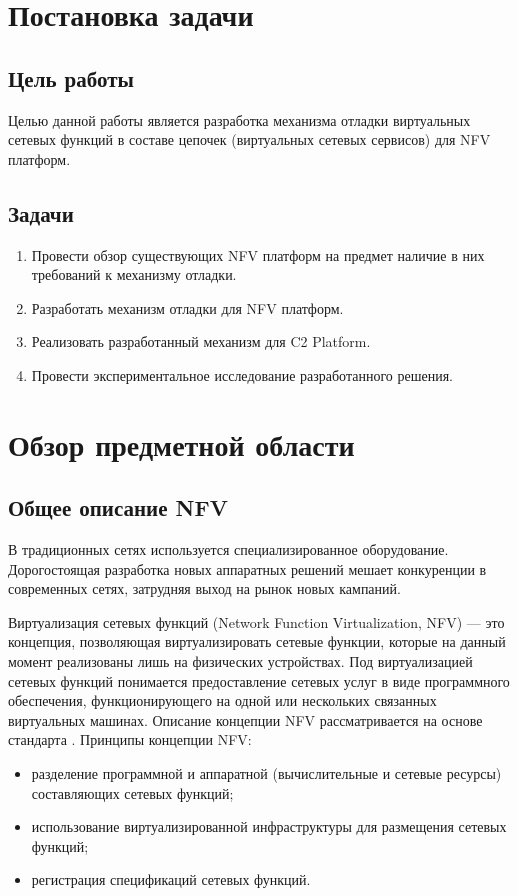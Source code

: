 \documentclass[oneside,final,14pt,a4paper]{extreport}
\begin{document}
\chapter{Постановка задачи}
\label{chap:problem_statement}
\section{Цель работы}
Целью данной работы является разработка механизма отладки виртуальных сетевых функций в составе цепочек (виртуальных сетевых сервисов) для NFV платформ.


\section{Задачи}
\begin{enumerate}
	\item Провести обзор существующих NFV платформ на предмет наличие в них требований к механизму отладки.
	\item Разработать механизм отладки для NFV платформ.
	\item Реализовать разработанный механизм для C2 Platform.
	\item Провести экспериментальное исследование разработанного решения.
\end{enumerate}





\chapter{Обзор предметной области}
\label{chap:overview_subject_area}



\section{Общее описание NFV}
\label{sec:nfv_description}
В традиционных сетях используется специализированное оборудование. Дорогостоящая разработка новых аппаратных решений мешает конкуренции в современных сетях, затрудняя выход на рынок новых кампаний.

Виртуализация сетевых функций (Network Function Virtualization, NFV) --- это концепция, позволяющая виртуализировать сетевые функции, которые на данный момент реализованы лишь на физических устройствах. Под виртуализацией сетевых функций понимается предоставление сетевых услуг в виде программного обеспечения, функционирующего на одной или нескольких связанных виртуальных машинах. Описание концепции NFV рассматривается на основе стандарта \cite{nfv-official}. Принципы концепции NFV:
\begin{itemize}
    \item разделение программной и аппаратной (вычислительные и сетевые ресурсы) составляющих сетевых функций;
    \item использование виртуализированной инфраструктуры для размещения сетевых функций;
    \item регистрация спецификаций сетевых функций.
\end{itemize}
\end{document}

